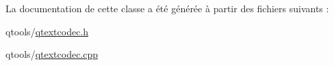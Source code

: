 La documentation de cette classe a été générée à partir des fichiers suivants \+:\begin{DoxyCompactItemize}
\item 
qtools/\hyperlink{qtextcodec_8h}{qtextcodec.\+h}\item 
qtools/\hyperlink{qtextcodec_8cpp}{qtextcodec.\+cpp}\end{DoxyCompactItemize}
